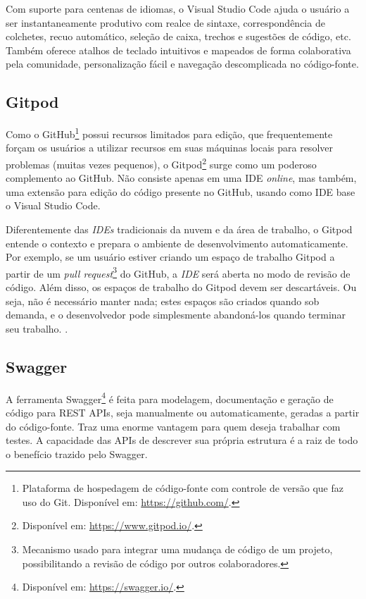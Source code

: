Com suporte para centenas de idiomas, o Visual Studio Code ajuda o usuário a ser instantaneamente produtivo com realce de sintaxe, correspondência de colchetes, recuo automático, seleção de caixa, trechos e sugestões de código, etc. Também oferece atalhos de teclado intuitivos e mapeados de forma colaborativa pela comunidade, personalização fácil e navegação descomplicada no código-fonte. \cite{microsoft2020VSCode}


\subsection{Gitpod}
\label{ssec:Gitpod}
Como o GitHub\footnote{Plataforma de hospedagem de código-fonte com controle de versão que faz uso do Git. Disponível em: \url{https://github.com/}.} possui recursos limitados para edição, que frequentemente forçam os usuários a utilizar recursos em suas máquinas locais para resolver problemas (muitas vezes pequenos), o Gitpod\footnote{Disponível em: \url{https://www.gitpod.io/}.} surge como um poderoso complemento ao GitHub. Não consiste apenas em uma IDE \textit{online}, mas também, uma extensão para edição do código presente no GitHub, usando como IDE base o Visual Studio Code. 

Diferentemente das \textit{IDEs} tradicionais da nuvem e da área de trabalho, o Gitpod entende o contexto e prepara o ambiente de desenvolvimento automaticamente. Por exemplo, se um usuário estiver criando um espaço de trabalho Gitpod a partir de um \textit{pull request}\footnote{Mecanismo usado para integrar uma mudança de código de um projeto, possibilitando a revisão de código por outros colaboradores.} do GitHub, a \textit{IDE} será aberta no modo de revisão de código. Além disso, os espaços de trabalho do Gitpod devem ser descartáveis. Ou seja, não é necessário manter nada; estes espaços são criados quando sob demanda, e o desenvolvedor pode simplesmente abandoná-los quando terminar seu trabalho. \cite{typefox2020Gitpod}.


\subsection{Swagger}
\label{ssec:Swagger}
A ferramenta Swagger\footnote{Disponível em: \url{https://swagger.io/}.} é feita para modelagem, documentação e geração de código para REST APIs, seja manualmente ou automaticamente, geradas a partir do código-fonte. Traz uma enorme vantagem para quem deseja trabalhar com testes. A capacidade das APIs de descrever sua própria estrutura é a raiz de todo o benefício trazido pelo Swagger.

